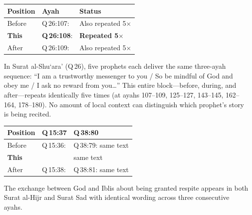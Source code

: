 \documentclass[11pt,a4paper]{article}
\newcommand{\textarabic}[1]{\texorpdfstring{\RL{#1}}{[Arabic]}}
\begin{document}
\begin{algorithm}[H]
\caption{Q\,26:108 --- ``So be mindful of God and obey me'' (also Q\,26:126, 26:144, 26:163, 26:179)}
\label{alg:stuck1}
\smallskip
\centering
\begin{tabular}{@{}l l l@{}}
\toprule
\textbf{Position} & \textbf{Ayah} & \textbf{Status} \\
\midrule
Before & Q\,26:107: \textarabic{إِنِّى لَكُمْ رَسُولٌ أَمِينٌ} & Also repeated 5$\times$ \\
\textbf{This} & \textbf{Q\,26:108}: \textarabic{فَٱتَّقُوا۟ ٱللَّهَ وَأَطِيعُونِ} & \textbf{Repeated 5$\times$} \\
After & Q\,26:109: \textarabic{وَمَآ أَسْـَٔلُكُمْ عَلَيْهِ مِنْ أَجْرٍ\ldots} & Also repeated 5$\times$ \\
\bottomrule
\end{tabular}
\smallskip

\raggedright
In Surat al-Shu`ara' (Q\,26), five prophets each deliver the same three-ayah sequence: ``I am a trustworthy messenger to you / So be mindful of God and obey me / I ask no reward from you\ldots'' This entire block---before, during, and after---repeats identically five times (at ayahs 107--109, 125--127, 143--145, 162--164, 178--180). No amount of local context can distinguish which prophet's story is being recited.
\end{algorithm}

\begin{algorithm}[H]
\caption{Q\,15:37 and Q\,38:80 --- ``He said: You are among those given respite''}
\label{alg:stuck2}
\smallskip
\centering
\begin{tabular}{@{}l l l@{}}
\toprule
\textbf{Position} & \textbf{Q\,15:37} & \textbf{Q\,38:80} \\
\midrule
Before & Q\,15:36: \textarabic{قَالَ رَبِّ فَأَنظِرْنِىٓ\ldots} & Q\,38:79: same text \\
\textbf{This} & \textarabic{قَالَ فَإِنَّكَ مِنَ ٱلْمُنظَرِينَ} & same text \\
After & Q\,15:38: \textarabic{إِلَىٰ يَوْمِ ٱلْوَقْتِ ٱلْمَعْلُومِ} & Q\,38:81: same text \\
\bottomrule
\end{tabular}
\smallskip

\raggedright
The exchange between God and Iblis about being granted respite appears in both Surat al-Hijr and Surat Sad with identical wording across three consecutive ayahs.
\end{algorithm}
\end{document}
